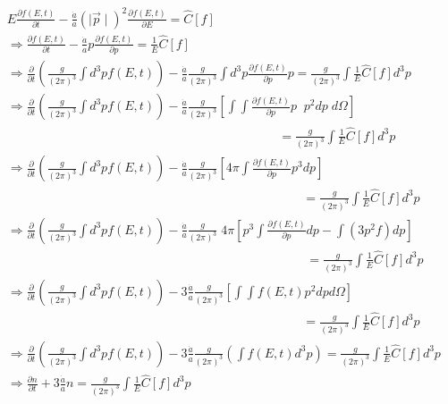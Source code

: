 \documentclass[12pt]{report}
\begin{document}
\begin{align*}
& E\frac{\partial f(E,t)}{\partial t}- \frac{\dot{a}}{a} \left(\mid \vec{p}\mid\right)^2 \frac{\partial f(E,t)}{\partial E} =\hat{C}[f]\\
& \Rightarrow \frac{\partial f(E,t)}{\partial t}- \frac{\dot{a}}{a} p \frac{\partial f(E,t)}{\partial p} = \frac{1}{E} \hat{C}[f]\\
& \Rightarrow \frac{\partial}{\partial t} \left( \frac{g}{(2 \pi)^3} \int d^3p f(E,t) \right)- \frac{\dot{a}}{a} \frac{g}{(2 \pi)^3} \int d^3p \frac{\partial f(E,t)}{\partial p} p = \frac{g}{(2 \pi)^3} \int \frac{1}{E} \hat{C}[f] d^3p \\
& \Rightarrow \frac{\partial}{\partial t} \left( \frac{g}{(2 \pi)^3} \int d^3p f(E,t) \right)- \frac{\dot{a}}{a} \frac{g}{(2 \pi)^3} \left[\int \int \frac{\partial f(E,t)}{\partial p} p\; \; p^2dp\;d\Omega \right] \\
&\;\;\;\;\;\;\;\;\;\;\;\;\;\;\;\;\;\;\;\;\;\;\;\;\;\;\;\;\;\;\;\;\;\;\;\;\;\;\;\;\;\;\;\;\;\;\;\;\;\;\;\;\;\;\;\;\;\;\;\;\;\;\;\;\;\;\;\;\;\;\;\;\;\;\;\;\;\; = \frac{g}{(2 \pi)^3} \int \frac{1}{E} \hat{C}[f] d^3p\\
& \Rightarrow \frac{\partial}{\partial t} \left( \frac{g}{(2 \pi)^3} \int d^3p f(E,t) \right)- \frac{\dot{a}}{a} \frac{g}{(2 \pi)^3} \left[4 \pi \int \frac{\partial f(E,t)}{\partial p} p^3dp \right] \\
&\;\;\;\;\;\;\;\;\;\;\;\;\;\;\;\;\;\;\;\;\;\;\;\;\;\;\;\;\;\;\;\;\;\;\;\;\;\;\;\;\;\;\;\;\;\;\;\;\;\;\;\;\;\;\;\;\;\;\;\;\;\;\;\;\;\;\;\;\;\;\;\;\;\;\;\;\;\;\;\;\;\;\;\;\;= \frac{g}{(2 \pi)^3} \int \frac{1}{E} \hat{C}[f] d^3p\\
& \Rightarrow \frac{\partial}{\partial t} \left( \frac{g}{(2 \pi)^3} \int d^3p f(E,t) \right)- \frac{\dot{a}}{a} \frac{g}{(2 \pi)^3} \; 4 \pi  \left[p ^3 \int \frac{\partial f(E,t)}{\partial p}dp- \int(3p^2f)dp \right]\\
&\;\;\;\;\;\;\;\;\;\;\;\;\;\;\;\;\;\;\;\;\;\;\;\;\;\;\;\;\;\;\;\;\;\;\;\;\;\;\;\;\;\;\;\;\;\;\;\;\;\;\;\;\;\;\;\;\;\;\;\;\;\;\;\;\;\;\;\;\;\;\;\;\;\;\;\;\;\;\;\;\;\;\;\;\;\; = \frac{g}{(2 \pi)^3} \int \frac{1}{E} \hat{C}[f] d^3p \\
& \Rightarrow \frac{\partial}{\partial t} \left( \frac{g}{(2 \pi)^3} \int d^3p f(E,t) \right)-3 \frac{\dot{a}}{a} \frac{g}{(2 \pi)^3} \left[\int \int f(E,t) p^2dpd\Omega \right] \\
&\;\;\;\;\;\;\;\;\;\;\;\;\;\;\;\;\;\;\;\;\;\;\;\;\;\;\;\;\;\;\;\;\;\;\;\;\;\;\;\;\;\;\;\;\;\;\;\;\;\;\;\;\;\;\;\;\;\;\;\;\;\;\;\;\;\;\;\;\;\;\;\;\;\;\;\;\;\;\;\;\;\;\;\;\;= \frac{g}{(2 \pi)^3} \int \frac{1}{E} \hat{C}[f] d^3p\\
& \Rightarrow \frac{\partial}{\partial t} \left( \frac{g}{(2 \pi)^3} \int d^3p f(E,t) \right)-3 \frac{\dot{a}}{a} \frac{g}{(2 \pi)^3} \left(\int f(E,t) d^3p \right) = \frac{g}{(2 \pi)^3} \int \frac{1}{E} \hat{C}[f] d^3p\\
&\Rightarrow \frac{\partial n}{\partial t} + 3 \frac{\dot{a}}{a}n=\frac{g}{(2 \pi)^3} \int \frac{1}{E} \hat{C}[f] d^3p \label{b1}
\end{align*}
\end{document}
